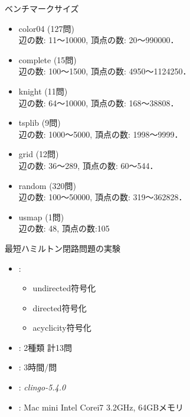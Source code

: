 \documentclass[dvipdfmx,10pt]{beamer}
\begin{document}
\begin{frame}[noframenumbering]{ベンチマークサイズ}
\begin{itemize}
\item \textsf{color04} (127問)\\
  辺の数: 11〜10000, 頂点の数: 20〜990000．
\item \textsf{complete} (15問)\\
  辺の数: 100〜1500, 頂点の数: 4950〜1124250．
\item \textsf{knight} (11問)\\
  辺の数: 64〜10000, 頂点の数: 168〜38808．
\item \textsf{tsplib} (9問)\\
  辺の数: 1000〜5000, 頂点の数: 1998〜9999．
\item \textsf{grid} (12問)\\
  辺の数: 36〜289, 頂点の数: 60〜544．
\item \textsf{random} (320問)\\
  辺の数: 100〜50000, 頂点の数: 319〜362828．
\item \textsf{usmap} (1問)\\
  辺の数: 48, 頂点の数:105 
\end{itemize}
\end{frame}

\begin{frame}[noframenumbering]{最短ハミルトン閉路問題の実験}
  \begin{itemize}
  \item {}:
    \begin{itemize}
    \item \textsf{undirected}符号化
    \item \textsf{directed}符号化
    \item \textsf{acyclicity}符号化
    \end{itemize}
  \item {}: 2種類 計13問
  \item {}: 3時間/問
  \item {}: \textit{clingo-5.4.0}
  \item {}: Mac mini Intel Corei7 3.2GHz, 64GBメモリ
  \end{itemize}
\end{frame}
\end{document}
